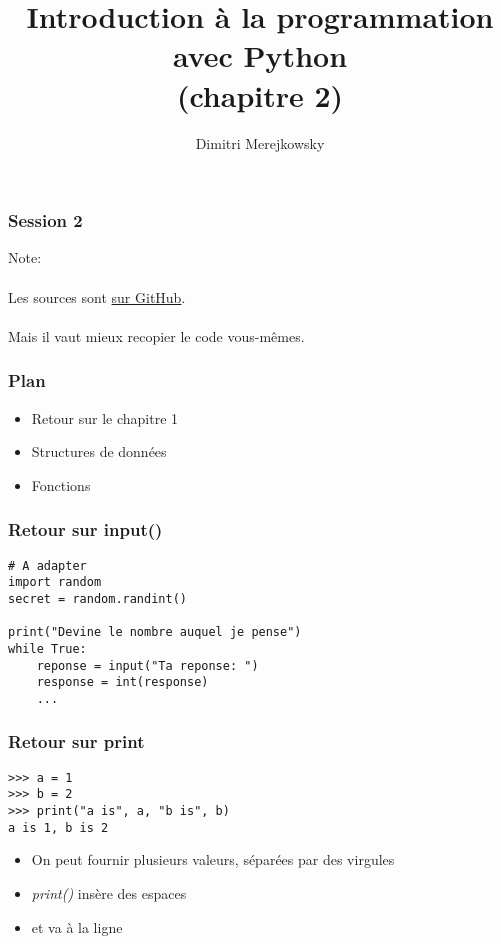\documentclass{beamer}
\title{Introduction à la programmation avec Python \\ (chapitre 2)}
\author{Dimitri Merejkowsky}
\institute{E2L}
\begin{document}
\frame{\titlepage}

\begin{frame}

\frametitle{Session 2}

\end{frame}

\begin{frame}

Note: \\~\\


Les sources sont
\href{https://github.com/E2L/cours-python/tree/master/sources}{sur GitHub}. \\~\\


Mais il vaut mieux recopier le code vous-mêmes.

\end{frame}


\begin{frame}

\frametitle{Plan}

\begin{itemize}
  \item Retour sur le chapitre 1
  \item Structures de données
  \item Fonctions
\end{itemize}

\end{frame}

\begin{frame}[fragile]
    \frametitle{Retour sur input()}



\begin{lstlisting}
# A adapter
import random
secret = random.randint()

print("Devine le nombre auquel je pense")
while True:
    reponse = input("Ta reponse: ")
    response = int(response)
    ...
\end{lstlisting}

\end{frame}



\begin{frame}[fragile]
    \frametitle{Retour sur print}

\begin{lstlisting}
>>> a = 1
>>> b = 2
>>> print("a is", a, "b is", b)
a is 1, b is 2
\end{lstlisting}

\begin{itemize}
  \item On peut fournir plusieurs valeurs, séparées par des virgules
  \item \textit{print()} insère des espaces
  \item et va à la ligne
\end{itemize}

\end{frame}
\end{document}
